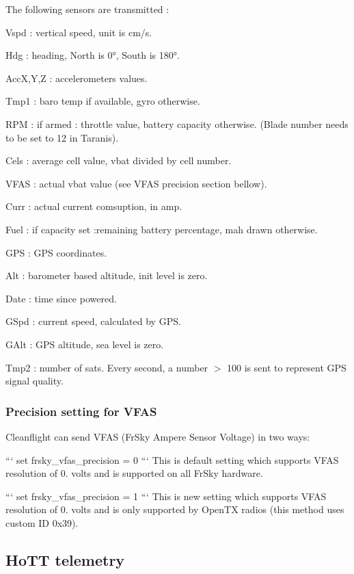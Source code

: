 The following sensors are transmitted \+:

Vspd \+: vertical speed, unit is cm/s.

Hdg \+: heading, North is 0°, South is 180°.

Acc\+X,Y,Z \+: accelerometers values.

Tmp1 \+: baro temp if available, gyro otherwise.

R\+P\+M \+: if armed \+: throttle value, battery capacity otherwise. (Blade number needs to be set to 12 in Taranis).

Cels \+: average cell value, vbat divided by cell number.

V\+F\+A\+S \+: actual vbat value (see V\+F\+A\+S precision section bellow).

Curr \+: actual current comsuption, in amp.

Fuel \+: if capacity set \+:remaining battery percentage, mah drawn otherwise.

G\+P\+S \+: G\+P\+S coordinates.

Alt \+: barometer based altitude, init level is zero.

Date \+: time since powered.

G\+Spd \+: current speed, calculated by G\+P\+S.

G\+Alt \+: G\+P\+S altitude, sea level is zero.

Tmp2 \+: number of sats. Every second, a number $>$ 100 is sent to represent G\+P\+S signal quality.

\subsubsection*{Precision setting for V\+F\+A\+S}

Cleanflight can send V\+F\+A\+S (Fr\+Sky Ampere Sensor Voltage) in two ways\+:

``` set frsky\+\_\+vfas\+\_\+precision = 0 ``` This is default setting which supports V\+F\+A\+S resolution of 0. volts and is supported on all Fr\+Sky hardware.

``` set frsky\+\_\+vfas\+\_\+precision = 1 ``` This is new setting which supports V\+F\+A\+S resolution of 0. volts and is only supported by Open\+T\+X radios (this method uses custom I\+D 0x39).

\subsection*{Ho\+T\+T telemetry}

